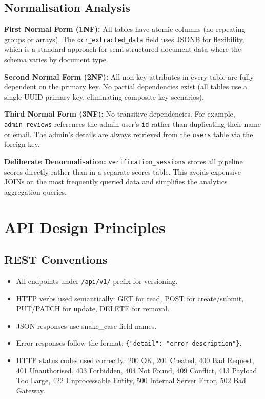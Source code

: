 \subsection{Normalisation Analysis}

\textbf{First Normal Form (1NF):} All tables have atomic columns (no repeating groups or arrays). The \texttt{ocr\_extracted\_data} field uses JSONB for flexibility, which is a standard approach for semi-structured document data where the schema varies by document type.

\textbf{Second Normal Form (2NF):} All non-key attributes in every table are fully dependent on the primary key. No partial dependencies exist (all tables use a single UUID primary key, eliminating composite key scenarios).

\textbf{Third Normal Form (3NF):} No transitive dependencies. For example, \texttt{admin\_reviews} references the admin user's \texttt{id} rather than duplicating their name or email. The admin's details are always retrieved from the \texttt{users} table via the foreign key.

\textbf{Deliberate Denormalisation:} \texttt{verification\_sessions} stores all pipeline scores directly rather than in a separate scores table. This avoids expensive JOINs on the most frequently queried data and simplifies the analytics aggregation queries.

\section{API Design Principles}

\subsection{REST Conventions}
\begin{itemize}
    \item All endpoints under \texttt{/api/v1/} prefix for versioning.
    \item HTTP verbs used semantically: GET for read, POST for create/submit, PUT/PATCH for update, DELETE for removal.
    \item JSON responses use snake\_case field names.
    \item Error responses follow the format: \texttt{\{"detail": "error description"\}}.
    \item HTTP status codes used correctly: 200 OK, 201 Created, 400 Bad Request, 401 Unauthorised, 403 Forbidden, 404 Not Found, 409 Conflict, 413 Payload Too Large, 422 Unprocessable Entity, 500 Internal Server Error, 502 Bad Gateway.
\end{itemize}

